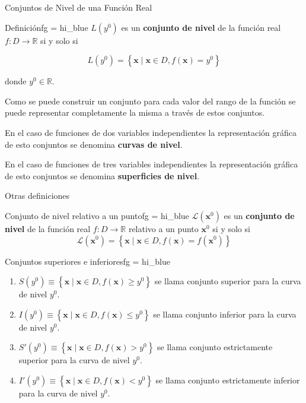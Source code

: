 \documentclass[10pt,aspectratio=169]{beamer}  %
\begin{document}
\begin{frame}{Conjuntos de Nivel de una Función Real}
	\begin{varblock}{Definición}{fg = hi_blue}
		$L(y^0)$ es un \textbf{conjunto de nivel} de la función real $f: D \rightarrow \mathbb{R}$ si y solo si
		
		\begin{equation*}
			 L(y^0) = \left\{ \mathbf{x} \mid \mathbf{x} \in D, f(\mathbf{x}) = y^0 \right\}
		\end{equation*}
		
		donde $y^0 \in \mathbb{R}$.
	\end{varblock}
	
	Como se puede construir un conjunto para cada valor del rango de la función	se puede representar 
	completamente la misma a través de estos conjuntos.
	
	En el caso de funciones de dos variables independientes la representación gráfica de esto conjuntos se denomina 
	\textbf{curvas de nivel}.

	En el caso de funciones de tres variables independientes la representación gráfica de esto conjuntos se denomina 
	\textbf{superficies de nivel}.
\end{frame}


\begin{frame}{Otras definiciones}
	\begin{varblock}{Conjunto de nivel relativo a un punto}{fg = hi_blue}
		$\mathcal{L}(\mathbf{x}^0)$ es un \textbf{conjunto de nivel} de la función real $f: D \rightarrow \mathbb{R}$ relativo 
		a un punto $\mathbf{x}^0 $ si y solo si
		\vspace{-3pt}
		\begin{equation*}
			 \mathcal{L}(\mathbf{x}^0) = \left\{ \mathbf{x} \mid \mathbf{x} \in D, f(\mathbf{x}) = f(\mathbf{x}^0) \right\}
		\end{equation*}

	\end{varblock}

	\begin{varblock}{Conjuntos superiores e inferiores}{fg = hi_blue}
		\begin{enumerate}[label=(\alph*)]
			\item $S(y^0) \equiv \left\{ \mathbf{x} \mid \mathbf{x} \in D, f(\mathbf{x}) \geq y^0 \right\}$ se llama
			conjunto superior para la curva de nivel $y^0$.
			\item $I(y^0) \equiv \left\{ \mathbf{x} \mid \mathbf{x} \in D, f(\mathbf{x}) \leq y^0 \right\}$ se llama
			conjunto inferior para la curva de nivel $y^0$.
			\item $S'(y^0) \equiv \left\{ \mathbf{x} \mid \mathbf{x} \in D, f(\mathbf{x}) > y^0 \right\}$ se llama
			conjunto estrictamente superior para la curva de nivel $y^0$.
			\item $I'(y^0) \equiv \left\{ \mathbf{x} \mid \mathbf{x} \in D, f(\mathbf{x}) < y^0 \right\}$ se llama
			conjunto estrictamente inferior para la curva de nivel $y^0$.
		\end{enumerate}
	
	\end{varblock}

\end{frame}
\end{document}
